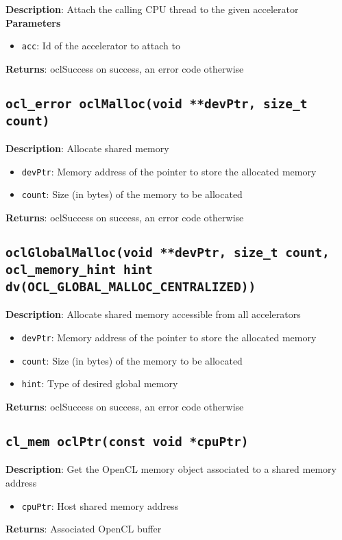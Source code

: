 \textbf{Description}: Attach the calling CPU thread to the given accelerator
\textbf{Parameters}
\begin{itemize}
  \item \texttt{acc}: Id of the accelerator to attach to
\end{itemize}
\textbf{Returns}: oclSuccess on success, an error code otherwise

\subsection{\texttt{ocl\_error oclMalloc(void **devPtr, size\_t count)}}

\textbf{Description}: Allocate shared memory
\begin{itemize}
  \item \texttt{devPtr}: Memory address of the pointer to store the allocated memory
  \item \texttt{count}: Size (in bytes) of the memory to be allocated
\end{itemize}
\textbf{Returns}: oclSuccess on success, an error code otherwise

\subsection{\texttt{oclGlobalMalloc(void **devPtr, size\_t count, ocl\_memory\_hint hint dv(OCL\_GLOBAL\_MALLOC\_CENTRALIZED))}}

\textbf{Description}: Allocate shared memory accessible from all accelerators
\begin{itemize}
  \item \texttt{devPtr}: Memory address of the pointer to store the allocated memory
  \item \texttt{count}: Size (in bytes) of the memory to be allocated
  \item \texttt{hint}: Type of desired global memory
\end{itemize}
\textbf{Returns}: oclSuccess on success, an error code otherwise

\subsection{\texttt{cl\_mem oclPtr(const void *cpuPtr)}}

\textbf{Description}: Get the OpenCL memory object associated to a shared memory address
\begin{itemize}
  \item \texttt{cpuPtr}: Host shared memory address
\end{itemize}
\textbf{Returns}: Associated OpenCL buffer

